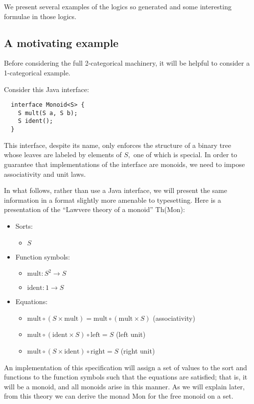 \documentclass{article}
\newcommand{\maps}{\colon}
\renewcommand{\left}{\mathrm{left}}
\renewcommand{\right}{\mathrm{right}}
\newcommand{\mult}{\mathrm{mult}}
\newcommand{\ident}{\mathrm{ident}}
\begin{document}
We present several examples of the logics so generated and some interesting formulae in those logics.

\subsection{A motivating example}

Before considering the full 2-categorical machinery, it will be helpful to consider a 1-categorical example.

Consider this Java interface:
\begin{verbatim}
  interface Monoid<S> {
    S mult(S a, S b);
    S ident();
  }
\end{verbatim}
This interface, despite its name, only enforces the structure of a binary tree whose leaves are labeled by elements of $S,$ one of which is special.  In order to guarantee that implementations of the interface are monoids, we need to impose associativity and unit laws.

In what follows, rather than use a Java interface, we will present the same information in a format slightly more amenable to typesetting.  Here is a presentation of the ``Lawvere theory of a monoid'' Th(Mon):\\
\begin{center}
  \begin{itemize}
    \item Sorts:
    \begin{itemize}
      \item $S$
    \end{itemize}
    \item Function symbols:
    \begin{itemize}
      \item $\mult\maps S^2 \to S$
      \item $\ident\maps 1 \to S$
    \end{itemize}
    \item Equations:
    \begin{itemize}
      \item $\mult \circ (S \times \mult) = \mult \circ (\mult \times S)$ (associativity)
      \item $\mult \circ (\ident \times S) \circ \left = S$ (left unit)
      \item $\mult \circ (S \times \ident) \circ \right = S$ (right unit)        
    \end{itemize}
  \end{itemize}
\end{center}
An implementation of this specification will assign a set of values to the sort and functions to the function symbols such that the equations are satisfied; that is, it will be a monoid, and all monoids arise in this manner.  As we will explain later, from this theory we can derive the monad Mon for the free monoid on a set.
\end{document}
